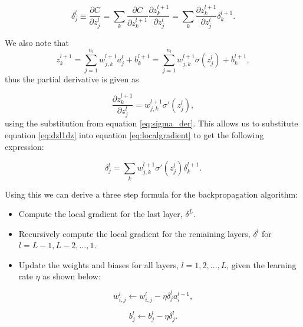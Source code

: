 \begin{equation}
    \label{eq:localgradient}
    \delta_j^l \equiv \frac{\partial C}{\partial z_j^l} = \sum_k \frac{\partial C}{\partial z_k^{l+1}}\frac{\partial z_k^{l+1}}{\partial z_j^l} = \sum_k \frac{\partial z_k^{l+1}}{\partial z_j^l} \delta_k^{l+1}.
\end{equation}

We also note that 
\begin{equation*}
    z_k^{l+1} = \sum_{j=1}^{n_l} w_{j,k}^{l+1}a_j^l + b_k^{l+1} = \sum_{j=1}^{n_l} w_{j,k}^{l+1}\sigma(z_j^l) + b_k^{l+1},
\end{equation*} 
thus the partial derivative is given as 

\begin{equation}
    \label{eq:dzl1dz}
    \frac{\partial z_k^{l+1}}{\partial z_j^l} = w_{j,k}^{l+1}\sigma'(z_j^l), 
\end{equation}
using the substitution from equation \ref{eq:sigma_der}. This allows us to substitute equation \ref{eq:dzl1dz} into equation \ref{eq:localgradient} to get the following expression:

\begin{equation}
    \label{eq:localgradient2}
    \delta_j^l = \sum_k w_{j,k}^{l+1}\sigma'(z_j^l)\delta_k^{l+1}.
\end{equation}

Using this we can derive a three step formula for the backpropagation algorithm:
\begin{itemize}
    \item Compute the local gradient for the last layer, $\delta^L$.
    \item Recursively compute the local gradient for the remaining layers, $\delta^l$ for $l=L-1, L-2, ..., 1$.
    \item Update the weights and biases for all layers, $l=1, 2, ..., L$, given the learning rate $\eta$ as shown below: 
\end{itemize}

\begin{equation*}
    w_{i,j}^{l} \leftarrow w_{i,j}^{l} - \eta \delta_j^l a_i^{l-1},
\end{equation*}


\begin{equation*}
    b_j^l \leftarrow b_j^l - \eta \delta_j^l.
\end{equation*}
